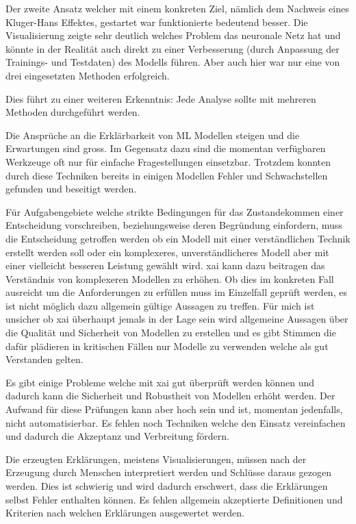 \documentclass[
  12pt, %
  a4paper, %
  oneside, %
  openany, 
  numbers=noenddot, %
  BCOR=5mm, %
  parskip=half*, %
  thesis, %
]{bfhbook}
\begin{document}
Der zweite Ansatz welcher mit einem konkreten Ziel, nämlich dem Nachweis eines Kluger-Hans Effektes, gestartet war funktionierte bedeutend besser. Die Visualisierung zeigte sehr deutlich welches Problem das neuronale Netz hat und könnte in der Realität auch direkt zu einer Verbesserung (durch Anpassung der Trainings- und Testdaten) des Modells führen. Aber auch hier war nur eine von drei eingesetzten Methoden erfolgreich. 

Dies führt zu einer weiteren Erkenntnis: Jede Analyse sollte mit mehreren Methoden durchgeführt werden. 

Die Ansprüche an die Erklärbarkeit von \Gls{ML} Modellen steigen und die Erwartungen sind gross. Im Gegensatz dazu sind die momentan verfügbaren Werkzeuge oft  nur für einfache Fragestellungen einsetzbar. Trotzdem konnten durch diese Techniken bereits in einigen Modellen Fehler und Schwachstellen gefunden und beseitigt werden. 

Für Aufgabengebiete welche strikte Bedingungen für das Zustandekommen einer Entscheidung vorschreiben, beziehungsweise deren Begründung einfordern, muss die Entscheidung getroffen werden ob ein Modell mit einer verständlichen Technik erstellt werden soll oder ein komplexeres, unverständlicheres Modell aber mit einer vielleicht besseren Leistung gewählt wird. \Gls{xai} kann dazu beitragen das Verständnis von komplexeren Modellen zu erhöhen. Ob dies im konkreten Fall ausreicht um die Anforderungen zu erfüllen muss im Einzelfall geprüft werden, es ist nicht möglich dazu allgemein gültige Aussagen zu treffen. Für mich ist unsicher ob \Gls{xai} überhaupt jemals in der Lage sein wird allgemeine Aussagen über die Qualität und Sicherheit von Modellen zu erstellen und es gibt Stimmen die dafür plädieren in kritischen Fällen nur Modelle zu verwenden welche als gut Verstanden gelten.

Es gibt einige Probleme welche mit \Gls{xai} gut überprüft werden können und dadurch kann die Sicherheit und Robustheit von Modellen erhöht werden. Der Aufwand für diese Prüfungen kann aber hoch sein und ist, momentan jedenfalls, nicht automatisierbar. Es fehlen noch Techniken welche den Einsatz vereinfachen und dadurch die Akzeptanz und Verbreitung fördern.

Die erzeugten Erklärungen, meistens Visualisierungen, müssen nach der Erzeugung durch Menschen interpretiert werden und Schlüsse daraus gezogen werden. Dies ist schwierig und wird dadurch erschwert, dass die Erklärungen selbst Fehler enthalten können. Es fehlen allgemein akzeptierte Definitionen und Kriterien nach welchen Erklärungen ausgewertet werden.
\end{document}
